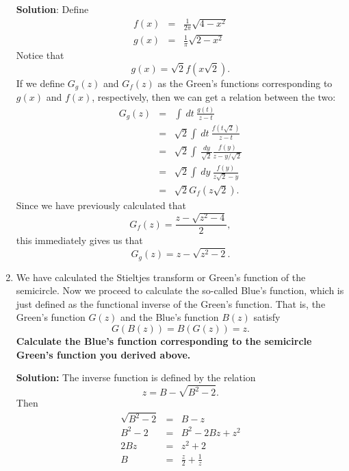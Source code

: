\documentclass[a4paper]{article}
\begin{document}
\begin{enumerate}[label=(\alph*)]
\begin{tcolorbox}
\textbf{Solution}: 
Define 
\begin{eqnarray}
    f(x) &=& \frac{1}{2\pi}\sqrt{4 - x^2} \\
    g(x) &=& \frac{1}{\pi}\sqrt{2 - x^2}
\end{eqnarray}
Notice that 
\begin{equation}
    g(x) = \sqrt{2} f(x\sqrt{2}).
\end{equation}
If we define $G_g(z)$ and $G_f(z)$ as the Green's functions corresponding to $g(x)$ and $f(x)$, respectively, then we can get a relation between the two:
\begin{eqnarray}
    G_g(z) &=& \int~dt~\frac{g(t)}{z - t} \\
    &=& \sqrt{2}\int~dt~\frac{f(t\sqrt{2})}{z - t} \\
    &=& \sqrt{2}\int~\frac{dy}{\sqrt{2}} \frac{f(y)}{z - y/\sqrt{2}} \\
    &=& \sqrt{2}\int~dy~\frac{f(y)}{z\sqrt{2} - y} \\
    &=& \sqrt{2}G_f(z\sqrt{2}).
\end{eqnarray}
Since we have previously calculated that 
\begin{equation}
    G_f(z) = \frac{z - \sqrt{z^2 - 4}}{2},
\end{equation}
this immediately gives us that
\begin{equation}
    G_g(z) = z - \sqrt{z^2 - 2}.
\end{equation}
\end{tcolorbox}

\item  We have calculated the Stieltjes transform or Green's function of the semicircle.  Now we proceed to calculate the so-called Blue's function, which is just defined as the functional inverse of the Green's function.  That is, the Green's function $G(z)$ and the Blue's function $B(z)$ satisfy 
\begin{equation}
    G(B(z)) = B(G(z)) = z.
\end{equation}
\textbf{Calculate the Blue's function corresponding to the semicircle Green's function you derived above.}

\begin{tcolorbox}
\textbf{Solution:}
The inverse function is defined by the relation 
\begin{equation}
    z = B - \sqrt{B^2 - 2}.
\end{equation}
Then 
\begin{eqnarray}
    \sqrt{B^2 - 2} &=& B - z \\
    B^2 - 2 &=& B^2 - 2Bz + z^2 \\
    2Bz &=& z^2 + 2 \\
    B &=& \frac{z}{2} + \frac{1}{z}
\end{eqnarray}
\end{tcolorbox}


\end{enumerate}
\end{document}
